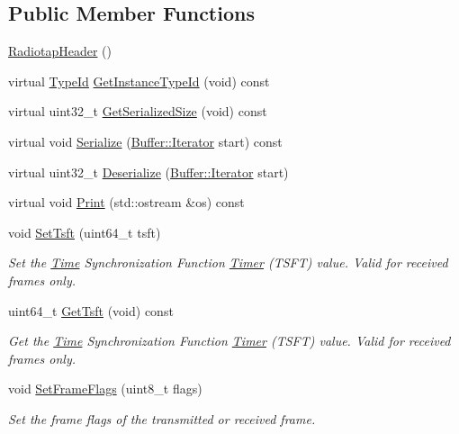 \subsection*{Public Member Functions}
\begin{DoxyCompactItemize}
\item 
\hyperlink{classns3_1_1RadiotapHeader_aba60b3398c8be1aa68b3e9de611f90fe}{Radiotap\+Header} ()
\item 
virtual \hyperlink{classns3_1_1TypeId}{Type\+Id} \hyperlink{classns3_1_1RadiotapHeader_a63634c2e5856fc0693fcd1b19ccdf25a}{Get\+Instance\+Type\+Id} (void) const 
\item 
virtual uint32\+\_\+t \hyperlink{classns3_1_1RadiotapHeader_a40ec904f318a5c24b6178e54208ec995}{Get\+Serialized\+Size} (void) const 
\item 
virtual void \hyperlink{classns3_1_1RadiotapHeader_a31d78b190e1969d9216e3be630b2b129}{Serialize} (\hyperlink{classns3_1_1Buffer_1_1Iterator}{Buffer\+::\+Iterator} start) const 
\item 
virtual uint32\+\_\+t \hyperlink{classns3_1_1RadiotapHeader_abf6c96491c49ece598cc16737b0696a7}{Deserialize} (\hyperlink{classns3_1_1Buffer_1_1Iterator}{Buffer\+::\+Iterator} start)
\item 
virtual void \hyperlink{classns3_1_1RadiotapHeader_aba8a0323732b5d6d48dd2cc50b7ed9fe}{Print} (std\+::ostream \&os) const 
\item 
void \hyperlink{classns3_1_1RadiotapHeader_a63ddcf8e8113dc90d072c194612436f8}{Set\+Tsft} (uint64\+\_\+t tsft)
\begin{DoxyCompactList}\small\item\em Set the \hyperlink{classns3_1_1Time}{Time} Synchronization Function \hyperlink{classns3_1_1Timer}{Timer} (T\+S\+FT) value. Valid for received frames only. \end{DoxyCompactList}\item 
uint64\+\_\+t \hyperlink{classns3_1_1RadiotapHeader_a1c15544d40f61e643310c93baf101dc6}{Get\+Tsft} (void) const 
\begin{DoxyCompactList}\small\item\em Get the \hyperlink{classns3_1_1Time}{Time} Synchronization Function \hyperlink{classns3_1_1Timer}{Timer} (T\+S\+FT) value. Valid for received frames only. \end{DoxyCompactList}\item 
void \hyperlink{classns3_1_1RadiotapHeader_af8c523ad1498c9105da3f88a0897d9b0}{Set\+Frame\+Flags} (uint8\+\_\+t flags)
\begin{DoxyCompactList}\small\item\em Set the frame flags of the transmitted or received frame. \end{DoxyCompactList}\item 

\end{DoxyCompactItemize}
